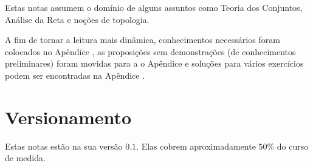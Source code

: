 Estas notas assumem o domínio de alguns assuntos como Teoria dos Conjuntos, Análise da Reta e noções de topologia.

A fim de tornar a leitura mais dinâmica, conhecimentos necessários foram colocados no Apêndice , as proposições sem demonstrações (de conhecimentos preliminares) foram movidas para a o Apêndice  e soluções para vários exercícios podem ser encontradas na Apêndice .

\section*{Versionamento}
Estas notas estão na sua versão $0.1$. Elas cobrem aproximadamente $50$\% do curso de medida.
